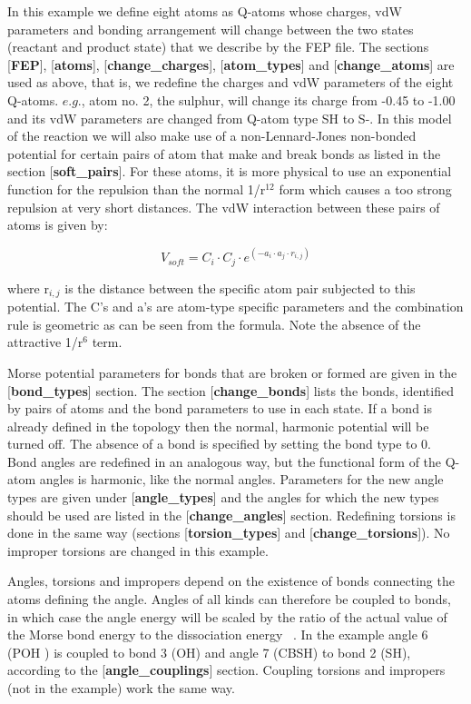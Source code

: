 \documentclass[a4paper,11pt]{article}
\let\origcite\cite
\def\cite#1{\unskip~\origcite{#1}}
\begin{document}
In this example we define eight atoms as Q-atoms whose charges,
vdW parameters and bonding arrangement will change between the two
states (reactant and product state) that we describe by the FEP
file. The sections [\textbf{FEP}], [\textbf{atoms}],
[\textbf{change{\_}charges}], [\textbf{atom{\_}types}] and
[\textbf{change{\_}atoms}] are used as above, that is, we redefine
the charges and vdW parameters of the eight Q-atoms. $e.g.$, atom
no. 2, the sulphur, will change its charge from -0.45 to -1.00 and
its vdW parameters are changed from Q-atom type SH to S-. In this
model of the reaction we will also make use of a non-Lennard-Jones
non-bonded potential for certain pairs of atom that make and break
bonds as listed in the section [\textbf{soft{\_}pairs}]. For these
atoms, it is more physical to use an exponential function for the
repulsion than the normal 1/r$^{12}$ form which causes a too
strong repulsion at very short distances. The vdW interaction
between these pairs of atoms is given by:

\[
V_{soft} = C_{i}\cdot C_{j}\cdot e^{\left(-a_{i}\cdot a_{j}\cdot
r_{i,j}\right)}
\]

where r$_{i,j}$ is the distance between the specific atom pair
subjected to this potential. The C's and a's are atom-type
specific parameters and the combination rule is geometric as can
be seen from the formula. Note the absence of the attractive
1/r$^{6}$ term.

Morse potential parameters for bonds that are broken or formed are
given in the [\textbf{bond{\_}types}] section. The section
[\textbf{change{\_}bonds}] lists the bonds, identified by pairs of
atoms and the bond parameters to use in each state. If a bond is
already defined in the topology then the normal, harmonic
potential will be turned off. The absence of a bond is specified
by setting the bond type to 0. Bond angles are redefined in an
analogous way, but the functional form of the Q-atom angles is
harmonic, like the normal angles. Parameters for the new angle
types are given under [\textbf{angle{\_}types}] and the angles for
which the new types should be used are listed in the
[\textbf{change{\_}angles}] section. Redefining torsions is done
in the same way (sections [\textbf{torsion{\_}types}] and
[\textbf{change{\_}torsions}]). No improper torsions are changed
in this example.

Angles, torsions and impropers depend on the existence of bonds
connecting the atoms defining the angle. Angles of all kinds can
therefore be coupled to bonds, in which case the angle energy will
be scaled by the ratio of the actual value of the Morse bond
energy to the dissociation energy \cite{Aqvist1991}. In the
example angle 6 (P{\-}O{\-}H ) is coupled to bond 3 (O{\-}H) and
angle 7 (CB{\-}S{\-}H) to bond 2 (S{\-}H), according to the
[\textbf{angle{\_}couplings}] section. Coupling torsions and
impropers (not in the example) work the same way.
\end{document}
